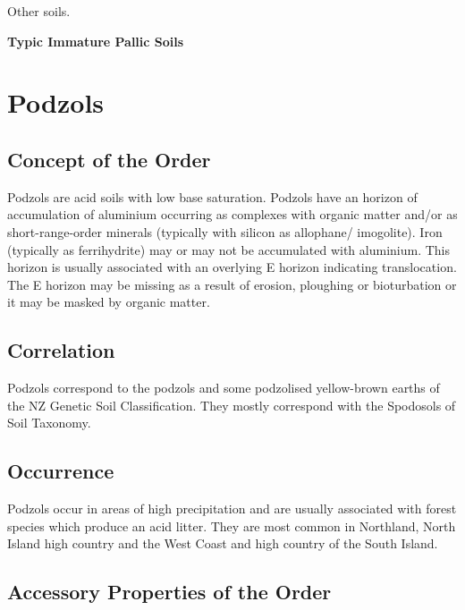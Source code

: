 \documentclass[
  letterpaper,
  DIV=11,
  numbers=noendperiod]{scrreprt}
\begin{document}
Other soils.

\textbf{Typic Immature Pallic Soils}


\hypertarget{sec-ord-Z}{%
\chapter{Podzols}\label{sec-ord-Z}}

\hypertarget{sec-con-Z}{%
\section{Concept of the Order}\label{sec-con-Z}}

Podzols are acid soils with low base saturation. Podzols have an horizon
of accumulation of aluminium occurring as complexes with organic matter
and/or as short-range-order minerals (typically with silicon as
allophane/ imogolite). Iron (typically as ferrihydrite) may or may not
be accumulated with aluminium. This horizon is usually associated with
an overlying E horizon indicating translocation. The E horizon may be
missing as a result of erosion, ploughing or bioturbation or it may be
masked by organic matter.

\hypertarget{sec-cor-Z}{%
\section{Correlation}\label{sec-cor-Z}}

Podzols correspond to the podzols and some podzolised yellow-brown
earths of the NZ Genetic Soil Classification. They mostly correspond
with the Spodosols of Soil Taxonomy.

\hypertarget{sec-occ-Z}{%
\section{Occurrence}\label{sec-occ-Z}}

Podzols occur in areas of high precipitation and are usually associated
with forest species which produce an acid litter. They are most common
in Northland, North Island high country and the West Coast and high
country of the South Island.

\hypertarget{sec-acc-Z}{%
\section{Accessory Properties of the Order}\label{sec-acc-Z}}
\end{document}
